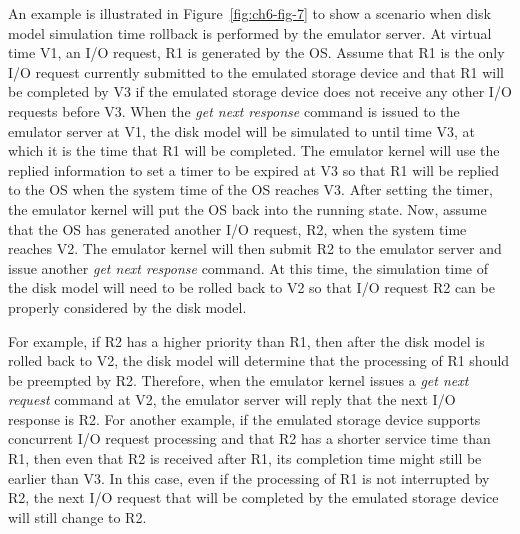 An example is illustrated in Figure~\ref{fig:ch6-fig-7} to show a scenario when disk model simulation time rollback is performed by the emulator server. At virtual time V1, an I/O request, R1 is generated by the OS. Assume that R1 is the only I/O request currently submitted to the emulated storage device and that R1 will be completed by V3 if the emulated storage device does not receive any other I/O requests before V3. When the \textit{get next response} command is issued to the emulator server at V1, the disk model will be simulated to until time V3, at which it is the time that R1 will be completed. The emulator kernel will use the replied information to set a timer to be expired at V3 so that R1 will be replied to the OS when the system time of the OS reaches V3. After setting the timer, the emulator kernel will put the OS back into the running state. Now, assume that the OS has generated another I/O request, R2, when the system time reaches V2. The emulator kernel will then submit R2 to the emulator server and issue another \textit{get next response} command. At this time, the simulation time of the disk model will need to be rolled back to V2 so that I/O request R2 can be properly considered by the disk model.

For example, if R2 has a higher priority than R1, then after the disk model is rolled back to V2, the disk model will determine that the processing of R1 should be preempted by R2. Therefore, when the emulator kernel issues a \textit{get next request} command at V2, the emulator server will reply that the next I/O response is R2. For another example, if the emulated storage device supports concurrent I/O request processing and that R2 has a shorter service time than R1, then even that R2 is received after R1, its completion time might still be earlier than V3. In this case, even if the processing of R1 is not interrupted by R2, the next I/O request that will be completed by the emulated storage device will still change to R2.

